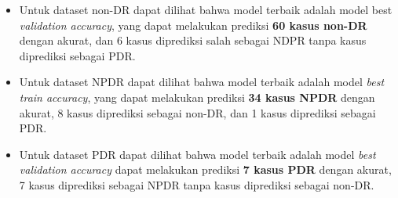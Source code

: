 \begin{itemize}
	\item Untuk dataset non-DR dapat dilihat bahwa model terbaik adalah model best \emph{validation accuracy}, yang dapat melakukan prediksi \textbf{60 kasus non-DR} dengan akurat, dan 6 kasus diprediksi salah sebagai NDPR tanpa kasus diprediksi sebagai PDR.
	
	\item Untuk dataset NPDR dapat dilihat bahwa model terbaik adalah model \emph{best train accuracy}, yang dapat melakukan prediksi \textbf{34 kasus NPDR} dengan akurat, 8 kasus diprediksi sebagai non-DR, dan 1 kasus diprediksi sebagai PDR.
	
	\item Untuk dataset PDR dapat dilihat bahwa model terbaik adalah model \emph{best validation accuracy} dapat melakukan prediksi \textbf{7 kasus PDR} dengan akurat, 7 kasus diprediksi sebagai NPDR tanpa kasus diprediksi sebagai non-DR.
\end{itemize}
\pagebreak


